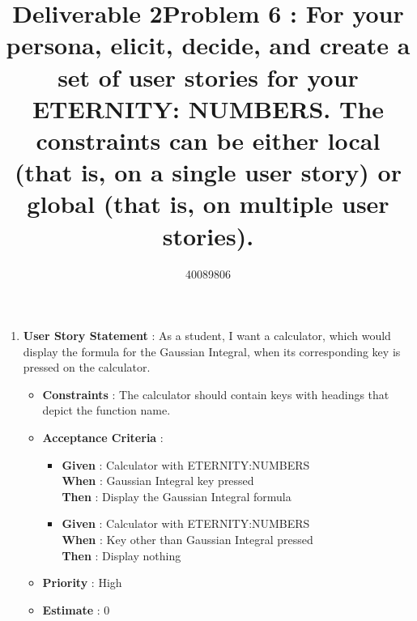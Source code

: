 \documentclass{article}
\title{Deliverable 2}
\author{40089806}
\begin{document}
\maketitle

\newpage
\title{\textbf{Problem 6 : For  your  persona,  elicit,  decide,  and  create  a  set  of  user  stories  for  your  ETERNITY: NUMBERS.  The  constraints  can  be  either  local  (that  is,  on  a  single  user  story)  or  global  (that is, on multiple user stories).  }}
\maketitle

\newpage \hfill\break


\begin{enumerate}
    \item \textbf{User Story Statement} : As a student, I want a calculator, which would display the formula for the Gaussian Integral, when its corresponding key is pressed on the calculator.
    \begin{itemize}
        \item \textbf{Constraints} : The calculator should contain keys with headings that depict the function name. 
        \item \textbf{Acceptance Criteria} : 
        
            \begin{itemize}
                \item \textbf{Given} : Calculator with ETERNITY:NUMBERS \\
                \textbf{When} : Gaussian Integral key pressed \\
                \textbf{Then} : Display the Gaussian Integral formula 
                \item  \textbf{Given} : Calculator with ETERNITY:NUMBERS \\
                \textbf{When} :  Key other than Gaussian Integral pressed \\
                \textbf{Then} : Display nothing
            \end{itemize}

        \item \textbf{Priority} : High
        \item \textbf{Estimate} : 0
    \end{itemize}
    

\end{enumerate}
\end{document}
